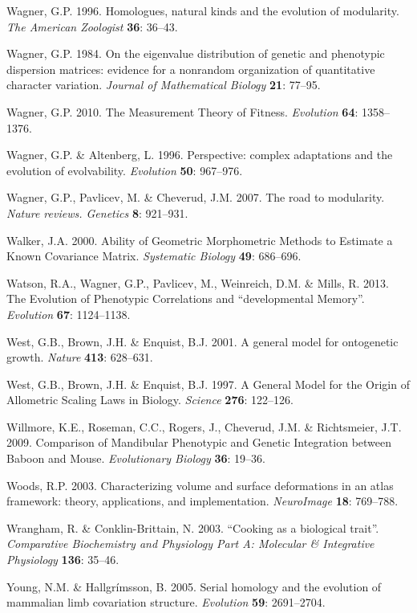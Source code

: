 \documentclass[12pt,twoside]{report}
\begin{document}
Wagner, G.P. 1996. Homologues, natural kinds and the evolution of
modularity. \emph{The American Zoologist} \textbf{36}: 36--43.

Wagner, G.P. 1984. On the eigenvalue distribution of genetic and
phenotypic dispersion matrices: evidence for a nonrandom organization of
quantitative character variation. \emph{Journal of Mathematical Biology}
\textbf{21}: 77--95.

Wagner, G.P. 2010. The Measurement Theory of Fitness. \emph{Evolution}
\textbf{64}: 1358--1376.

Wagner, G.P. \& Altenberg, L. 1996. Perspective: complex adaptations and
the evolution of evolvability. \emph{Evolution} \textbf{50}: 967--976.

Wagner, G.P., Pavlicev, M. \& Cheverud, J.M. 2007. The road to
modularity. \emph{Nature reviews. Genetics} \textbf{8}: 921--931.

Walker, J.A. 2000. Ability of Geometric Morphometric Methods to Estimate
a Known Covariance Matrix. \emph{Systematic Biology} \textbf{49}:
686--696.

Watson, R.A., Wagner, G.P., Pavlicev, M., Weinreich, D.M. \& Mills, R.
2013. The Evolution of Phenotypic Correlations and ``developmental
Memory''. \emph{Evolution} \textbf{67}: 1124--1138.

West, G.B., Brown, J.H. \& Enquist, B.J. 2001. A general model for
ontogenetic growth. \emph{Nature} \textbf{413}: 628--631.

West, G.B., Brown, J.H. \& Enquist, B.J. 1997. A General Model for the
Origin of Allometric Scaling Laws in Biology. \emph{Science}
\textbf{276}: 122--126.

Willmore, K.E., Roseman, C.C., Rogers, J., Cheverud, J.M. \&
Richtsmeier, J.T. 2009. Comparison of Mandibular Phenotypic and Genetic
Integration between Baboon and Mouse. \emph{Evolutionary Biology}
\textbf{36}: 19--36.

Woods, R.P. 2003. Characterizing volume and surface deformations in an
atlas framework: theory, applications, and implementation.
\emph{NeuroImage} \textbf{18}: 769--788.

Wrangham, R. \& Conklin-Brittain, N. 2003. ``Cooking as a biological
trait''. \emph{Comparative Biochemistry and Physiology Part A: Molecular
\& Integrative Physiology} \textbf{136}: 35--46.

Young, N.M. \& Hallgrímsson, B. 2005. Serial homology and the evolution
of mammalian limb covariation structure. \emph{Evolution} \textbf{59}:
2691--2704.
\end{document}
